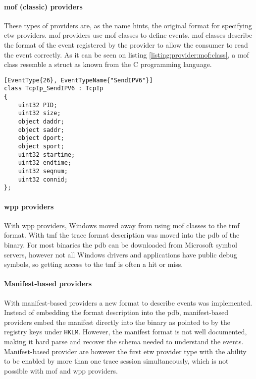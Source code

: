 \documentclass{report}
\begin{document}
\paragraph{\gls{mof} (classic) providers}
These types of providers are, as the name hints, the original format for specifying \gls{etw} providers. \gls{mof} providers use \gls{mof} classes\cite{url:etw:provider-types:mof:classes} to define events. \gls{mof} classes describe the format of the event registered by the provider to allow the consumer to read the event correctly. As it can be seen on listing \ref{listing:provider:mof:class}, a \gls{mof} class resemble a struct as known from the C programming language.

\begin{listing}[H]
\begin{verbatim}
[EventType{26}, EventTypeName{"SendIPV6"}]
class TcpIp_SendIPV6 : TcpIp
{
    uint32 PID;
    uint32 size;
    object daddr;
    object saddr;
    object dport;
    object sport;
    uint32 startime;
    uint32 endtime;
    uint32 seqnum;
    uint32 connid;
};
\end{verbatim}
\caption{\texttt{TcpIp_SendIPV6 : TcpIp} \gls{mof} class}
\label{listing:provider:mof:class}
\end{listing}

\paragraph{\gls{wpp} providers}
With \gls{wpp} providers, Windows moved away from using \gls{mof} classes to the \gls{tmf} format. With \gls{tmf} the trace format description was moved into the \gls{pdb} of the binary. For most binaries the \gls{pdb} can be downloaded from Microsoft symbol servers\cite{url:microsoft:public-symbol-server}, however not all Windows drivers and applications have public debug symbols, so getting access to the \gls{tmf} is often a hit or miss.

\paragraph{Manifest-based providers}
With manifest-based providers a new format to describe events was implemented. Instead of embedding the format description into the \gls{pdb}, manifest-based providers embed the manifest directly into the binary as pointed to by the registry keys under \texttt{HKLM\SOFTWARE\Microsoft\Windows\CurrentVersion\WINEVT\Publishers}. However, the manifest format is not well documented, making it hard parse and recover the schema needed to understand the events\cite{url:etw:various-information}. Manifest-based provider are however the first \gls{etw} provider type with the ability to be enabled by more than one trace session simultaneously, which is not possible with \gls{mof} and \gls{wpp} providers.
\end{document}
